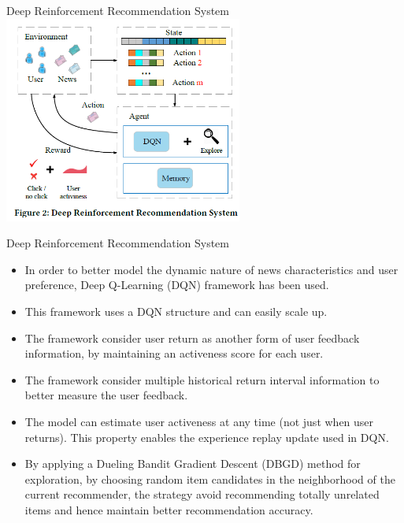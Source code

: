 \begin{frame}{Deep Reinforcement Recommendation System}
\includegraphics[height=6.8cm]{figure 2.png}
\centering
\end{frame}

\begin{frame}{Deep Reinforcement Recommendation System}
\begin{itemize}

 \item In order to better model the dynamic nature of news characteristics and user preference, Deep Q-Learning (DQN) framework has been used.
       \item This framework uses a DQN structure and can easily scale up.
       \item The framework consider user return as another form of user feedback information, by maintaining an activeness score for each user.
       \item The framework consider multiple historical return interval information to better measure the user feedback.
       \item The model can estimate user activeness at any time (not just when user returns). This property enables the experience replay update used in DQN.
       \item By applying a Dueling Bandit Gradient Descent (DBGD) method for exploration, by choosing random item candidates in the neighborhood of the current recommender, the strategy avoid recommending totally unrelated items and hence maintain better recommendation accuracy.
       \end{itemize}
\end{frame}

